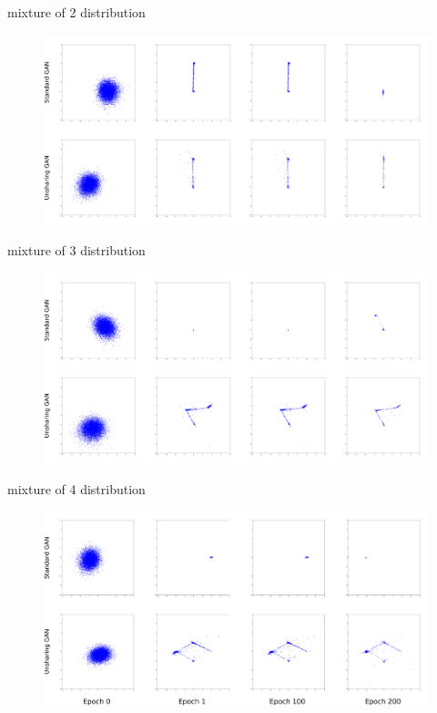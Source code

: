 \documentclass[dvipdfmx,12pt,unicode]{beamer}
\begin{document}
\begin{frame}{mixture of 2 distribution}
  \begin{figure}[htb]
    \centering        
    \includegraphics[width=\linewidth]{2_mixture_gan.png}
  \end{figure}
\end{frame}

\begin{frame}{mixture of 3 distribution}
  \begin{figure}[htb]
    \centering    
    \includegraphics[width=\linewidth]{3_mixture_gan.png}
  \end{figure}
\end{frame}

\begin{frame}{mixture of 4 distribution}
  \begin{figure}[htb]
    \centering        
    \includegraphics[width=\linewidth]{4_mixture_gan.png}
  \end{figure}
\end{frame}
\end{document}
